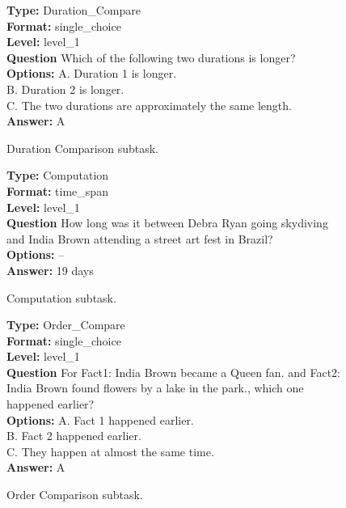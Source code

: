 \documentclass{article} %
\begin{document}
\begin{figure}[htbp]
\begin{tcolorbox}[
colframe=black!75!white, 
colback=white, sharp corners, 
boxrule=0.8pt, width=\textwidth,
title=Duration Comparison
] 
\textbf{Type:} Duration\_Compare \\
\textbf{Format:} single\_choice \\
\textbf{Level:} level\_1 \\
\textbf{Question} Which of the following two durations is longer? \\
\textbf{Options:} A. Duration 1 is longer. \\
B. Duration 2 is longer. \\
C. The two durations are approximately the same length. \\
\textbf{Answer:} A
\end{tcolorbox} 
\caption{Duration Comparison subtask.}
\label{fig:duration_comparison}
\end{figure}

\begin{figure}[htbp]
\begin{tcolorbox}[
colframe=black!75!white, 
colback=white, sharp corners, 
boxrule=0.8pt, width=\textwidth,
title=Computation
] 
\textbf{Type:} Computation \\
\textbf{Format:} time\_span \\
\textbf{Level:} level\_1 \\
\textbf{Question} How long was it between Debra Ryan going skydiving and India Brown attending a street art fest in Brazil? \\
\textbf{Options:} -- \\
\textbf{Answer:} 19 days
\end{tcolorbox} 
\caption{Computation subtask.}
\label{fig:computation}
\end{figure}

\begin{figure}[htbp]
\begin{tcolorbox}[
colframe=black!75!white, 
colback=white, sharp corners, 
boxrule=0.8pt, width=\textwidth,
title=Order Comparison
] 
\textbf{Type:} Order\_Compare \\
\textbf{Format:} single\_choice \\
\textbf{Level:} level\_1 \\
\textbf{Question} For Fact1: India Brown became a Queen fan. and Fact2: India Brown found flowers by a lake in the park., which one happened earlier? \\
\textbf{Options:} A. Fact 1 happened earlier. \\
B. Fact 2 happened earlier. \\
C. They happen at almost the same time. \\
\textbf{Answer:} A
\end{tcolorbox} 
\caption{Order Comparison subtask.}
\label{fig:order_comparison}
\end{figure}
\end{document}
